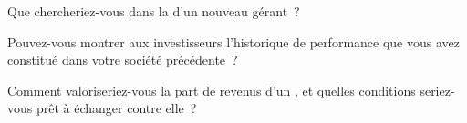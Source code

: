 \begin{interviewq}\label{iq:fm:launching-a-fund-and-raising-capital:4}
Que chercheriez-vous dans la  d'un nouveau gérant~?
\end{interviewq}

\begin{interviewq}\label{iq:fm:launching-a-fund-and-raising-capital:5}
Pouvez-vous montrer aux investisseurs l'historique de performance que vous avez constitué dans votre société précédente~?
\end{interviewq}

\begin{interviewq}\label{iq:fm:launching-a-fund-and-raising-capital:6}
Comment valoriseriez-vous la part de revenus d'un , et quelles conditions seriez-vous prêt à échanger contre elle~?
\end{interviewq}
